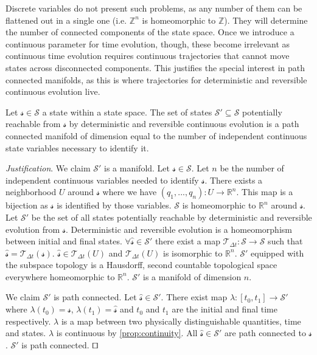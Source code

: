 \documentclass[smallextended]{svjour3}
\numberwithin{equation}{section}
\newenvironment{justification}{\emph{Justification}.}{\hfill\(\qed\)}
\begin{document}
Discrete variables do not present such problems, as any number of them can be flattened out in a single one (i.e. $\mathbb{Z}^n$ is homeomorphic to $\mathbb{Z}$). They will determine the number of connected components of the state space. Once we introduce a continuous parameter for time evolution, though, these become irrelevant as continuous time evolution requires continuous trajectories that cannot move states across disconnected components. This justifies the special interest in path connected manifolds, as this is where trajectories for deterministic and reversible continuous evolution live.

\begin{prop}\label{prop:manifold}
	Let $\mathcal{s} \in \mathcal{S}$ a state within a state space. The set of states $\mathcal{S}'\subseteq\mathcal{S}$ potentially reachable from $\mathcal{s}$ by deterministic and reversible continuous evolution is a path connected manifold of dimension equal to the number of independent continuous state variables necessary to identify it.
\end{prop}

\begin{justification}
	We claim $\mathcal{S}'$ is a manifold. Let $\mathcal{s} \in \mathcal{S}$. Let $n$ be the number of independent continuous variables needed to identify $\mathcal{s}$. There exists a neighborhood $U$ around $\mathcal{s}$ where we have $(q_1,...,q_n):U\rightarrow \mathbb{R}^n$. This map is a bijection as $\mathcal{s}$ is identified by those variables. $\mathcal{S}$ is homeomorphic to $\mathbb{R}^n$ around  $\mathcal{s}$. Let $\mathcal{S}'$ be the set of all states potentially reachable by deterministic and reversible evolution from $\mathcal{s}$. Deterministic and reversible evolution is a homeomorphism between initial and final states. $\forall \hat{\mathcal{s}} \in \mathcal{S}'$ there exist a map $\mathcal{T}_{\Delta t}:\mathcal{S} \rightarrow \mathcal{S}$ such that $\hat{\mathcal{s}} =\mathcal{T}_{\Delta t}(\mathcal{s})$. $\hat{\mathcal{s}} \in \mathcal{T}_{\Delta t}(U)$ and $\mathcal{T}_{\Delta t}(U)$ is isomorphic to $\mathbb{R}^n$. $\mathcal{S}'$ equipped with the subspace topology is a Hausdorff, second countable topological space everywhere homeomorphic to $\mathbb{R}^n$. $\mathcal{S}'$ is a manifold of dimension $n$.
	
	We claim $\mathcal{S}'$ is path connected. Let $\hat{\mathcal{s}} \in \mathcal{S}'$. There exist map $\lambda : [t_0,t_1] \rightarrow \mathcal{S}'$ where $\lambda(t_0)=\mathcal{s}$, $\lambda(t_1)=\hat{\mathcal{s}}$ and $t_0$ and $t_1$ are the initial and final time respectively. $\lambda$ is a map between two physically distinguishable quantities, time and states. $\lambda$ is continuous by \ref{prop:continuity}. All $\hat{\mathcal{s}} \in \mathcal{S}'$ are path connected to $\mathcal{s}$. $\mathcal{S}'$ is path connected.
\end{justification}
\end{document}

